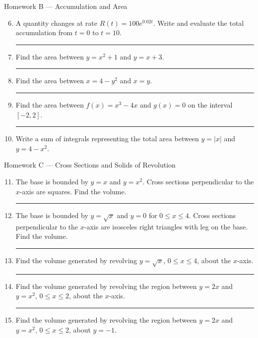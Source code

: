 \documentclass[11pt]{article}
\newcommand{\hwspace}{\vspace{0.8em}\hrule\vspace{0.8em}}
\begin{document}
\begin{homeworkset}{Homework B --- Accumulation and Area}
\begin{enumerate}
\setcounter{enumi}{5}
    \item A quantity changes at rate \(R(t)=100e^{0.02t}\). Write and evaluate the total accumulation from \(t=0\) to \(t=10\).
    \hwspace

    \item Find the area between \(y=x^2+1\) and \(y=x+3\).
    \hwspace

    \item Find the area between \(x=4-y^2\) and \(x=y\).
    \hwspace

    \item Find the area between \(f(x)=x^3-4x\) and \(g(x)=0\) on the interval \([-2,2]\).
    \hwspace

    \item Write a sum of integrals representing the total area between \(y=|x|\) and \(y=4-x^2\).
\end{enumerate}
\end{homeworkset}

\begin{homeworkset}{Homework C --- Cross Sections and Solids of Revolution}
\begin{enumerate}
\setcounter{enumi}{10}
    \item The base is bounded by \(y=x\) and \(y=x^2\). Cross sections perpendicular to the \(x\)-axis are squares. Find the volume.
    \hwspace

    \item The base is bounded by \(y=\sqrt{x}\) and \(y=0\) for \(0\le x\le 4\). Cross sections perpendicular to the \(x\)-axis are isosceles right triangles with leg on the base. Find the volume.
    \hwspace

    \item Find the volume generated by revolving \(y=\sqrt{x}\), \(0\le x\le 4\), about the \(x\)-axis.
    \hwspace

    \item Find the volume generated by revolving the region between \(y=2x\) and \(y=x^2\), \(0\le x\le 2\), about the \(x\)-axis.
    \hwspace

    \item Find the volume generated by revolving the region between \(y=2x\) and \(y=x^2\), \(0\le x\le 2\), about \(y=-1\).
\end{enumerate}
\end{homeworkset}
\end{document}
